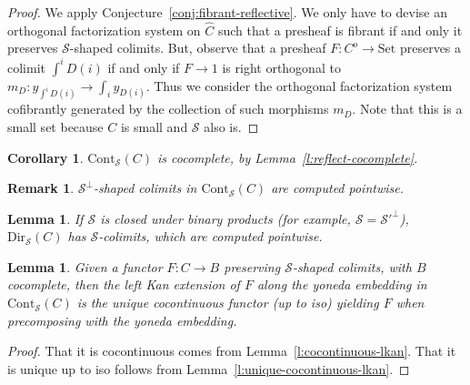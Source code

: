 \documentclass{article}
\newcommand{\Cont}[1]{\text{Cont}_{#1}}
\newcommand{\Dir}[1]{\text{Dir}_{#1}}
\newcommand{\Set}{\text{Set}}
\newtheorem{corollary}[theorem]{Corollary}
\newtheorem{remark}[theorem]{Remark}
\newtheorem{lemma}[theorem]{Lemma}
\begin{document}
  \begin{proof}
    We apply Conjecture~\ref{conj:fibrant-reflective}.
    We only have to devise an orthogonal factorization system on $\hat{C}$ such that a
    presheaf is fibrant if and only it preserves $\mathcal{S}$-shaped colimits.
    But, observe that a presheaf $F:C^o \rightarrow \Set$  preserves a colimit $\int^i D(i)$ if and
    only if $F\rightarrow 1$ is right orthogonal to $m_D:y_{\int^i D(i)}\rightarrow \int_i y_{D(i)}  $.
    Thus we consider the orthogonal factorization system cofibrantly generated
    by the collection of such morphisms $m_D$. Note that this is a small set
    because $C$ is small and $\mathcal{S}$ also is.
  \end{proof}
  \begin{corollary}
    $\Cont{\mathcal{S}}(C)$ is cocomplete, by Lemma~\ref{l:reflect-cocomplete}.
  \end{corollary}
  \begin{remark}
    $\mathcal{S}^\bot$-shaped colimits in $\Cont{\mathcal{S}}(C)$ are computed pointwise.
  \end{remark}
  \begin{lemma}
    If $\mathcal{S}$ is closed under binary products (for example, $\mathcal{S}
    = {\mathcal{S}'}^\bot$),
    $\Dir{\mathcal{S}}(C)$ has $\mathcal{S}$-colimits, which are
    computed pointwise.
  \end{lemma}
  \begin{lemma}
    Given a functor $F:C \rightarrow B$ preserving $\mathcal{S}$-shaped
    colimits, with $B$ cocomplete, then the left Kan extension of $F$ along the
    yoneda embedding in $\Cont{\mathcal{S}}(C)$ is the unique cocontinuous
    functor (up to iso) yielding $F$ when precomposing with the yoneda embedding.
  \end{lemma}
  \begin{proof}
    That it is cocontinuous comes from Lemma~\ref{l:cocontinuous-lkan}. That it
    is unique up to iso follows from Lemma~\ref{l:unique-cocontinuous-lkan}.
  \end{proof}
\end{document}
